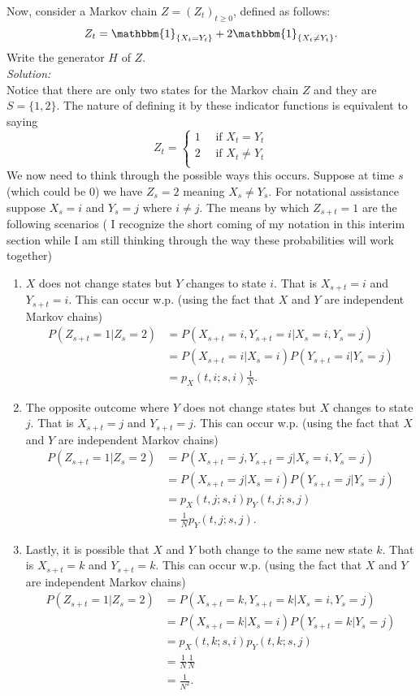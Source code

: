\documentclass[10pt]{amsart}
\begin{document}
 Now, consider a Markov chain $Z=(Z_t)_{t\geq0}$, defined as follows:
$$Z_t=\mathbbm{1}_{\{X_t=Y_t\}}+2 \mathbbm{1}_{\{X_t\neq Y_t\}}.$$
Write the generator $H$ of $Z$. \\
\textit{Solution: } \\
Notice that there are only two states for the Markov chain $Z$ and they are $S = \{1, 2\}$.
The nature of defining it by these indicator functions is equivalent to saying
$$
Z_t = \begin{cases}
1 \quad \text{ if } X_t = Y_t\\
2 \quad \text{ if } X_t \neq Y_t\\
\end{cases}
$$
We now need to think through the possible ways this occurs.
Suppose at time $s$ (which could be $0$) we have $Z_s = 2$ meaning $X_s \neq Y_s$.
For notational assistance suppose $X_s = i$ and $Y_s = j$ where $i \neq j$.
The means by which $Z_{s + t} = 1$ are the following scenarios ( I recognize the short coming of my notation in this interim section while I am still thinking through the way these probabilities will work together)
\begin{enumerate}
\item $X$ does not change states but $Y$ changes to state $i$.
That is $X_{s + t} = i$ and $Y_{s + t} = i$.
This can occur w.p. (using the fact that $X$ and $Y$ are independent Markov chains)
\begin{align*}
P(Z_{s + t} = 1 | Z_s = 2)
	&= P(X_{s + t} = i,Y_{s + t} = i | X_s = i,Y_s = j) \\
	&= P(X_{s + t} = i| X_s = i)P(Y_{s + t} = i | Y_s = j) \\
	&= p_X(t,i;s,i) \frac 1 N.
\end{align*}
\item The opposite outcome where $Y$ does not change states but $X$ changes to state $j$.
That is $X_{s + t} = j$ and $Y_{s + t} = j$.
This can occur w.p. (using the fact that $X$ and $Y$ are independent Markov chains)
\begin{align*}
P(Z_{s + t} = 1 | Z_s = 2)
	&= P(X_{s + t} = j,Y_{s + t} = j | X_s = i,Y_s = j) \\
	&= P(X_{s + t} = j| X_s = i)P(Y_{s + t} = j | Y_s = j) \\
	&= p_X(t,j;s,i)p_Y(t,j;s,j) \\
	&= \frac 1 N p_Y(t,j;s,j).
\end{align*}
\item Lastly, it is possible that $X$ and $Y$ both change to the same new state $k$.
That is $X_{s + t} = k$ and $Y_{s + t} = k$.
This can occur w.p. (using the fact that $X$ and $Y$ are independent Markov chains)
\begin{align*}
P(Z_{s + t} = 1 | Z_s = 2)
	&= P(X_{s + t} = k,Y_{s + t} = k | X_s = i,Y_s = j) \\
	&= P(X_{s + t} = k| X_s = i)P(Y_{s + t} = k | Y_s = j) \\
	&= p_X(t,k;s,i)p_Y(t,k;s,j) \\
	&= \frac 1 N \frac 1 N \\
	&= \frac 1 {N^2}.
\end{align*}
\end{enumerate}
\end{document}
